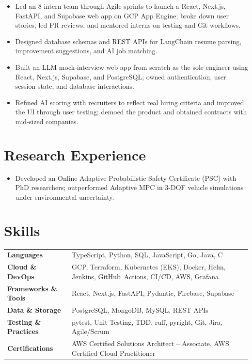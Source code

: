 \documentclass[11pt, letterpaper]{article}
\begin{document}
\begin{itemize}
  \item Led an 8-intern team through Agile sprints to launch a React, Next.js, FastAPI, and Supabase web app on GCP App Engine; broke down user stories, led PR reviews, and mentored interns on testing and Git workflows.
  \item Designed database schemas and REST APIs for LangChain resume parsing, improvement suggestions, and AI job matching.
\end{itemize}

\begin{itemize}
  \item Built an LLM mock-interview web app from scratch as the sole engineer using React, Next.js, Supabase, and PostgreSQL; owned authentication, user session state, and database interactions.
  \item Refined AI scoring with recruiters to reflect real hiring criteria and improved the UI through user testing; demoed the product and obtained contracts with mid-sized companies.
\end{itemize}

\section{Research Experience}
\begin{itemize}
  \item Developed an Online Adaptive Probabilistic Safety Certificate (PSC) with PhD researchers; outperformed Adaptive MPC in 3-DOF vehicle simulations under environmental uncertainty.
\end{itemize}

\section{Skills}
\begin{tabularx}{\textwidth}{@{}l @{\hspace{7pt}} >{\raggedright\arraybackslash}X@{}}
  \textbf{Languages} & TypeScript, Python, SQL, JavaScript, Go, Java, C \\[1pt]
  \textbf{Cloud \& DevOps} & GCP, Terraform, Kubernetes (EKS), Docker, Helm, Jenkins, GitHub~Actions, CI/CD, AWS, Grafana \\[1pt]
  \textbf{Frameworks \& Tools} & React, Next.js, FastAPI, Pydantic, Firebase, Supabase \\[1pt]
  \textbf{Data \& Storage} & PostgreSQL, MongoDB, MySQL, REST APIs \\[1pt]
  \textbf{Testing \& Practices} & pytest, Unit Testing, TDD, ruff, pyright, Git, Jira, Agile/Scrum \\[1pt]
  \textbf{Certifications} & AWS Certified Solutions Architect -- Associate, AWS Certified Cloud Practitioner \\
\end{tabularx}
\end{document}
